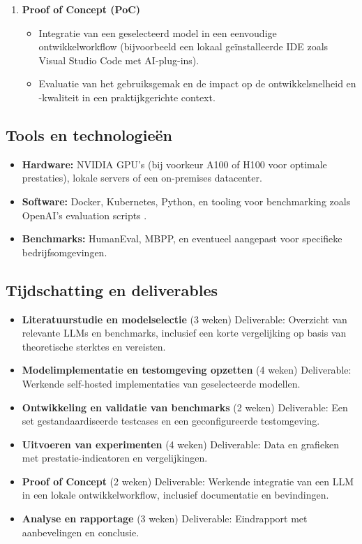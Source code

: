 \begin{enumerate}
    \item \textbf{Proof of Concept (PoC)}
    \begin{itemize}
        \item Integratie van een geselecteerd model in een eenvoudige ontwikkelworkflow (bijvoorbeeld een lokaal geïnstalleerde IDE zoals Visual Studio Code met AI-plug-ins).
        \item Evaluatie van het gebruiksgemak en de impact op de ontwikkelsnelheid en -kwaliteit in een praktijkgerichte context.
    \end{itemize}
\end{enumerate}

\subsection{Tools en technologieën}

\begin{itemize}
    \item \textbf{Hardware:} NVIDIA GPU’s (bij voorkeur A100 of H100 voor optimale prestaties), lokale servers of een on-premises datacenter.
    \item \textbf{Software:} Docker, Kubernetes, Python, en tooling voor benchmarking zoals OpenAI’s evaluation scripts \autocite{Brown2020}.
    \item \textbf{Benchmarks:} HumanEval, MBPP, en eventueel aangepast voor specifieke bedrijfsomgevingen.
\end{itemize}

\subsection{Tijdschatting en deliverables}

\begin{itemize}
    \item \textbf{Literatuurstudie en modelselectie} (3 weken)  
    Deliverable: Overzicht van relevante LLMs en benchmarks, inclusief een korte vergelijking op basis van theoretische sterktes en vereisten.

    \item \textbf{Modelimplementatie en testomgeving opzetten} (4 weken)  
    Deliverable: Werkende self-hosted implementaties van geselecteerde modellen.

    \item \textbf{Ontwikkeling en validatie van benchmarks} (2 weken)  
    Deliverable: Een set gestandaardiseerde testcases en een geconfigureerde testomgeving.

    \item \textbf{Uitvoeren van experimenten} (4 weken)  
    Deliverable: Data en grafieken met prestatie-indicatoren en vergelijkingen.

    \item \textbf{Proof of Concept} (2 weken)  
    Deliverable: Werkende integratie van een LLM in een lokale ontwikkelworkflow, inclusief documentatie en bevindingen.

    \item \textbf{Analyse en rapportage} (3 weken)  
    Deliverable: Eindrapport met aanbevelingen en conclusie.
\end{itemize}


